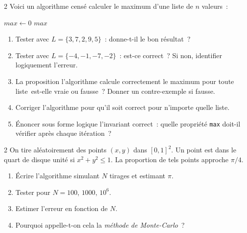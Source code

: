 \begin{probleme}{2}
Voici un algorithme cens\'e calculer le maximum d'une liste de $n$ valeurs~:

\begin{algorithm}[H]
\caption{Maximum (avec bug)}
$\mathit{max} \leftarrow 0$\;
\Afficher $\mathit{max}$\;
\end{algorithm}

\begin{enumerate}
  \item Tester avec $L = \{3, 7, 2, 9, 5\}$~: donne-t-il le bon r\'esultat~?
  \item Tester avec $L = \{-4, -1, -7, -2\}$~: est-ce correct~?
        Si non, identifier logiquement l'erreur.
  \item La proposition \og l'algorithme calcule correctement le maximum
        pour toute liste\fg\ est-elle vraie ou fausse~?
        Donner un contre-exemple si fausse.
  \item Corriger l'algorithme pour qu'il soit correct pour n'importe quelle liste.
  \item \'Enoncer sous forme logique l'invariant correct~: quelle propri\'et\'e
        \texttt{max} doit-il v\'erifier apr\`es chaque it\'eration~?
\end{enumerate}
\end{probleme}




\begin{probleme}{2}
On tire al\'eatoirement des points $(x,y)$ dans $[0,1]^2$.
Un point est dans le quart de disque unit\'e si $x^2+y^2\leq 1$.
La proportion de tels points approche $\pi/4$.
\begin{enumerate}
  \item \'Ecrire l'algorithme simulant $N$ tirages et estimant $\pi$.
  \item Tester pour $N = 100$, $1000$, $10^6$.
  \item Estimer l'erreur en fonction de $N$.
  \item Pourquoi appelle-t-on cela la \emph{m\'ethode de Monte-Carlo}~?
\end{enumerate}
\end{probleme}

